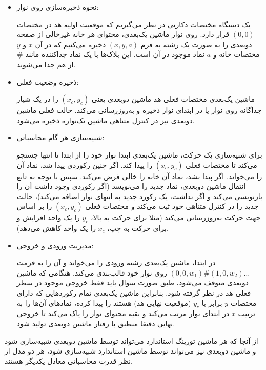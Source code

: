 \begin{itemize}
    \item {نحوه ذخیره‌سازی روی نوار:} 

    یک دستگاه مختصات دکارتی در نظر می‌گیریم که موقعیت اولیه هد در مختصات $(0,0)$ قرار دارد. روی نوار ماشین یک‌بعدی، محتوای هر خانه غیرخالی از صفحه دوبعدی را به صورت یک رشته به فرم $(x, y, a)$ ذخیره می‌کنیم که در آن $x$ و $y$ مختصات خانه و $a$ نماد موجود در آن است. این بلاک‌ها با یک نماد جداکننده مانند $\#$ از هم جدا می‌شوند.
    
    \item {ذخیره وضعیت فعلی:}

    ماشین یک‌بعدی مختصات فعلی هد ماشین دوبعدی یعنی $(x_c, y_c)$ را در یک شیار جداگانه روی نوار یا در ابتدای نوار ذخیره و به‌روزرسانی می‌کند. حالت فعلی ماشین دوبعدی نیز در کنترل متناهی ماشین تک‌نواره ذخیره می‌شود.
    
    \item {شبیه‌سازی هر گام محاسباتی:} 

    برای شبیه‌سازی یک حرکت، ماشین یک‌بعدی ابتدا نوار خود را از ابتدا تا انتها جستجو می‌کند تا مختصات فعلی $(x_c, y_c)$ را پیدا کند. 
    اگر چنین رکوردی پیدا شد، نماد آن را می‌خواند. اگر پیدا نشد، نماد آن خانه را خالی فرض می‌کند.
    سپس با توجه به تابع انتقال ماشین دوبعدی، نماد جدید را می‌نویسد (اگر رکوردی وجود داشت آن را بازنویسی می‌کند و اگر نداشت، یک رکورد جدید به انتهای نوار اضافه می‌کند)، حالت جدید را در کنترل متناهی خود ثبت می‌کند و مختصات فعلی $(x_c, y_c)$ را بر اساس جهت حرکت به‌روزرسانی می‌کند (مثلا برای حرکت به بالا، $y_c$ را یک واحد افزایش و برای حرکت به چپ، $x_c$ را یک واحد کاهش می‌دهد).
    
    \item {مدیریت ورودی و خروجی:}

     در ابتدا، ماشین یک‌بعدی رشته ورودی را می‌خواند و آن را به فرمت $(0,0,w_1)\#(1,0,w_2)\dots$ روی نوار خود قالب‌بندی می‌کند. 
    هنگامی که ماشین دوبعدی متوقف می‌شود، طبق صورت سوال باید فقط خروجی موجود در سطر فعلی هد در نظر گرفته شود. بنابراین ماشین یک‌بعدی تمام رکوردهایی که دارای مختصات $y$ برابر با $y_c$ (موقعیت نهایی هد) هستند را پیدا کرده، نمادهای آن‌ها را به ترتیب $x$ در ابتدای نوار مرتب می‌کند و بقیه محتوای نوار را پاک می‌کند تا خروجی نهایی دقیقا منطبق با رفتار ماشین دوبعدی تولید شود.
\end{itemize}

از آنجا که هر ماشین تورینگ استاندارد می‌تواند توسط ماشین دوبعدی شبیه‌سازی شود و ماشین دوبعدی نیز می‌تواند توسط ماشین استاندارد شبیه‌سازی شود، هر دو مدل از نظر قدرت محاسباتی معادل یکدیگر هستند.
